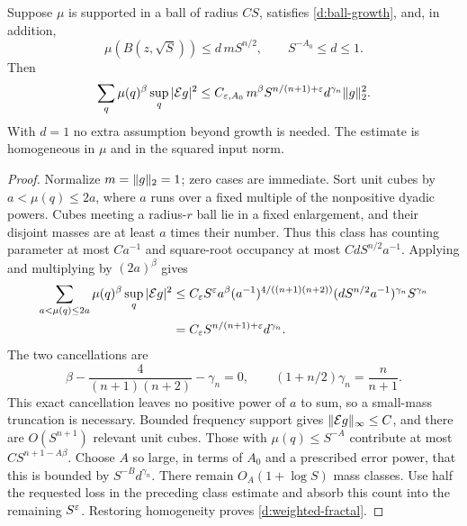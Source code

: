 \begin{proposition}
\label{d:fractal}
\label{d:refined}
Suppose $\mu$ is supported in a ball of radius $CS$, satisfies
\eqref{d:ball-growth}, and, in addition,
\begin{equation}
 \mu(B(z,\sqrt S))\le d\,m S^{n/2},
 \qquad S^{-A_0}\le d\le1.
 \label{d:sqrt-occupancy}
\end{equation}
Then
\begin{equation}
 \sum_q\mu(q)^\beta\sup_q|\mathcal E g|^2
 \le C_{\varepsilon,A_0}\,m^\beta
       S^{n/(n+1)+\varepsilon}d^{\gamma_n}\lVert g\rVert_2^2.
 \label{d:weighted-fractal}
\end{equation}
With $d=1$ no extra assumption beyond growth is needed.  The estimate
is homogeneous in $\mu$ and in the squared input norm.
\end{proposition}

\begin{proof}
Normalize $m=\lVert g\rVert_2=1$; zero cases are immediate.  Sort unit cubes
by $a<\mu(q)\le2a$, where $a$ runs over a fixed multiple of the
nonpositive dyadic powers.  Cubes meeting a radius-$r$ ball lie in a
fixed enlargement, and their disjoint masses are at least $a$ times
their number.  Thus this class has counting parameter at most $Ca^{-1}$
and square-root occupancy at most $CdS^{n/2}a^{-1}$.  Applying
 and multiplying by $(2a)^\beta$ gives
\begin{align*}
 \sum_{a<\mu(q)\le2a}\mu(q)^\beta\sup_q|\mathcal E g|^2
 &\le C_\varepsilon S^\varepsilon a^\beta
       (a^{-1})^{4/((n+1)(n+2))}
       (dS^{n/2}a^{-1})^{\gamma_n}S^{\gamma_n}\\
 &=C_\varepsilon S^{n/(n+1)+\varepsilon}d^{\gamma_n}.
\end{align*}
The two cancellations are
\[
 \beta-\frac4{(n+1)(n+2)}-\gamma_n=0,
 \qquad (1+n/2)\gamma_n=\frac n{n+1}.
\]
This exact cancellation leaves no positive power of $a$ to sum, so a
small-mass truncation is necessary.  Bounded frequency support gives
$\lVert \mathcal E g\rVert_\infty\le C$, and there are $O(S^{n+1})$ relevant
unit cubes.  Those with $\mu(q)\le S^{-A}$ contribute at most
$CS^{n+1-A\beta}$.  Choose $A$ so large, in terms of $A_0$ and a
prescribed error power, that this is bounded by
$S^{-B}d^{\gamma_n}$.  There remain $O_A(1+\log S)$ mass classes.
Use half the requested loss in the preceding class estimate and absorb
this count into the remaining $S^\varepsilon$.  Restoring homogeneity proves
\eqref{d:weighted-fractal}.
\end{proof}

